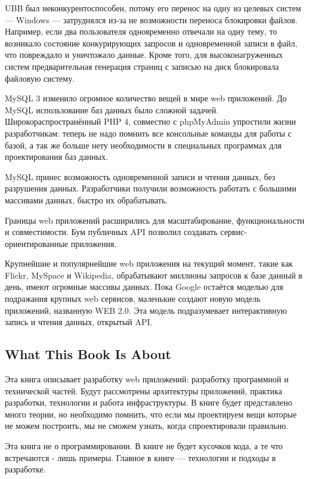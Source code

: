 UBB был неконкурентоспособен, потому его перенос на одну из целевых систем --- Windows --- затруднялся из-за не возможности переноса блокировки файлов. Например, если два пользователя одновременно отвечали на одну тему, то возникало состояние конкурирующих запросов и одновременной записи в файл, что повреждало и уничтожало данные. Кроме того, для высоконагруженных систем предварительная генерация страниц  с записью на диск блокировала файловую систему.


MySQL 3 изменило огромное количество вещей в мире web приложений. До MySQL использование баз данных было сложной задачей. Широкораспространённый PHP 4, совместно с phpMyAdmin упростили жизни разработчикам: теперь не надо помнить все консольные команды для работы с базой, а так же больше нету необходимости в специальных программах для проектирования баз данных.

MySQL принес возможность одновременной записи и чтения данных, без разрушения данных. Разработчики получили возможность работать с большими массивами данных, быстро их обрабатывать.

Границы web приложений расширились для масштабирование, функциональности и совместимости. Бум публичных API позволил создавать сервис-ориентированные приложения.

Крупнейшие и популярнейшие web приложения на текущий момент, такие как  Flickr, MySpace и Wikipedia, обрабатывают миллионы запросов к базе данный в день, имеют огромные массивы данных. Пока Google остаётся моделью для подражания крупных web сервисов, маленькие создают новую модель приложений, названную WEB 2.0. Эта модель подразумевает интерактивную запись и чтения данных, открытый API.

\subsection{What This Book Is About} \label{subsect1_1_1}

Эта книга описывает разработку web приложений: разработку программной и технической частей. Будут рассмотрены архитектуры приложений, практика разработки, технологии и работа инфраструктуры. В книге будет представлено много теории, но необходимо помнить, что если мы проектируем вещи которые не можем построить, мы не сможем узнать, когда спроектировали правильно.


Эта книга не о программировании. В книге не будет кусочков кода, а те что встречаются - лишь примеры. Главное в книге --- технологии и подходы в разработке.









\clearpage